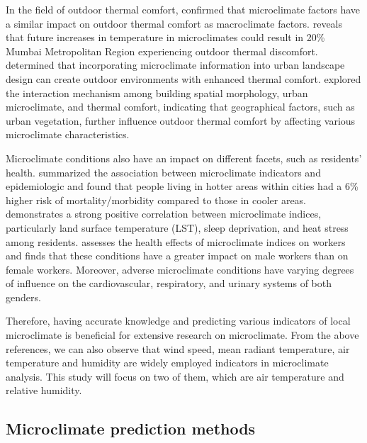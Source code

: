 \documentclass[a4paper,fleqn]{cas-sc}
\begin{document}
In the field of outdoor thermal comfort, \citet{zhang2022assessment} confirmed that microclimate factors have a similar impact on outdoor thermal comfort as macroclimate factors. \citet{vinayak2022impacts} reveals that future increases in temperature in microclimates could result in 20\% Mumbai Metropolitan Region experiencing outdoor thermal discomfort. \cite{lin2021integrating} determined that incorporating microclimate information into urban landscape design can create outdoor environments with enhanced thermal comfort. \cite{zhang2022impact} explored the interaction mechanism among building spatial morphology, urban microclimate, and thermal comfort, indicating that geographical factors, such as urban vegetation, further influence outdoor thermal comfort by affecting various microclimate characteristics. 

Microclimate conditions also have an impact on different facets, such as residents' health. \cite{schinasi2018modification} summarized the association between microclimate indicators and epidemiologic and found that people living in hotter areas within cities had a 6\% higher risk of mortality/morbidity compared to those in cooler areas. \cite{zeren2023geographic} demonstrates a strong positive correlation between microclimate indices, particularly land surface temperature (LST), sleep deprivation, and heat stress among residents. \cite{alimukhamedov2022hygienic} assesses the health effects of microclimate indices on workers and finds that these conditions have a greater impact on male workers than on female workers. Moreover, adverse microclimate conditions have varying degrees of influence on the cardiovascular, respiratory, and urinary systems of both genders.


Therefore, having accurate knowledge and predicting various indicators of local microclimate is beneficial for extensive research on microclimate. From the above references, we can also observe that wind speed, mean radiant temperature, air temperature and humidity are widely employed indicators in microclimate analysis. This study will focus on two of them, which are air temperature and relative humidity. 

\subsection{Microclimate prediction methods}
\end{document}
